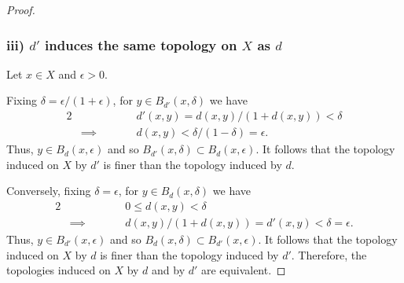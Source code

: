 \begin{solution}
\begin{proof}
    \subsubsection*{iii) $d'$ induces the same topology on $X$ as $d$}
    Let $x \in X$ and $\epsilon > 0$.

    Fixing $\delta = \epsilon / (1 + \epsilon)$, for $y \in B_{d'}(x, \delta)$ we have
    \begin{alignat*}{2}
      &           && \qquad d'(x, y) = d(x, y) / (1 + d(x, y)) < \delta \\
      & \implies  && \qquad d(x, y) < \delta / (1 - \delta) = \epsilon.
    \end{alignat*}
    Thus, $y \in B_d(x, \epsilon)$ and so $B_{d'}(x, \delta) \subset B_d(x, \epsilon)$.
    It follows that the topology induced on $X$ by $d'$ is finer than the topology induced by $d$.

    Conversely, fixing $\delta = \epsilon$, for $y \in B_d(x, \delta)$ we have
    \begin{alignat*}{2}
      &           && \qquad 0 \leq d(x, y) < \delta \\
      & \implies  && \qquad d(x, y) / (1 + d(x, y)) = d'(x, y) < \delta = \epsilon.
    \end{alignat*}
    Thus, $y \in B_{d'}(x, \epsilon)$ and so $B_d(x, \delta) \subset B_{d'}(x, \epsilon)$.
    It follows that the topology induced on $X$ by $d$ is finer than the topology induced by $d'$.
    Therefore, the topologies induced on $X$ by $d$ and by $d'$ are equivalent.
  \end{proof}
\end{solution}

